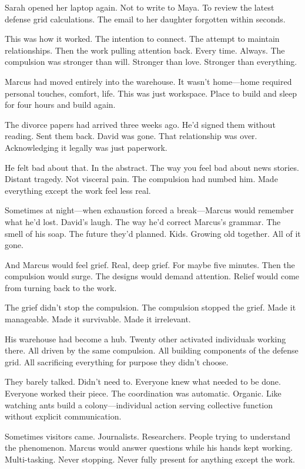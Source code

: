 Sarah opened her laptop again. Not to write to Maya. To review the latest defense grid calculations. The email to her daughter forgotten within seconds.

This was how it worked. The intention to connect. The attempt to maintain relationships. Then the work pulling attention back. Every time. Always. The compulsion was stronger than will. Stronger than love. Stronger than everything.

\scenebreak

Marcus had moved entirely into the warehouse. It wasn't home—home required personal touches, comfort, life. This was just workspace. Place to build and sleep for four hours and build again.

The divorce papers had arrived three weeks ago. He'd signed them without reading. Sent them back. David was gone. That relationship was over. Acknowledging it legally was just paperwork.

He felt bad about that. In the abstract. The way you feel bad about news stories. Distant tragedy. Not visceral pain. The compulsion had numbed him. Made everything except the work feel less real.

Sometimes at night—when exhaustion forced a break—Marcus would remember what he'd lost. David's laugh. The way he'd correct Marcus's grammar. The smell of his soap. The future they'd planned. Kids. Growing old together. All of it gone.

And Marcus would feel grief. Real, deep grief. For maybe five minutes. Then the compulsion would surge. The designs would demand attention. Relief would come from turning back to the work.

The grief didn't stop the compulsion. The compulsion stopped the grief. Made it manageable. Made it survivable. Made it irrelevant.

His warehouse had become a hub. Twenty other activated individuals working there. All driven by the same compulsion. All building components of the defense grid. All sacrificing everything for purpose they didn't choose.

They barely talked. Didn't need to. Everyone knew what needed to be done. Everyone worked their piece. The coordination was automatic. Organic. Like watching ants build a colony—individual action serving collective function without explicit communication.

Sometimes visitors came. Journalists. Researchers. People trying to understand the phenomenon. Marcus would answer questions while his hands kept working. Multi-tasking. Never stopping. Never fully present for anything except the work.

